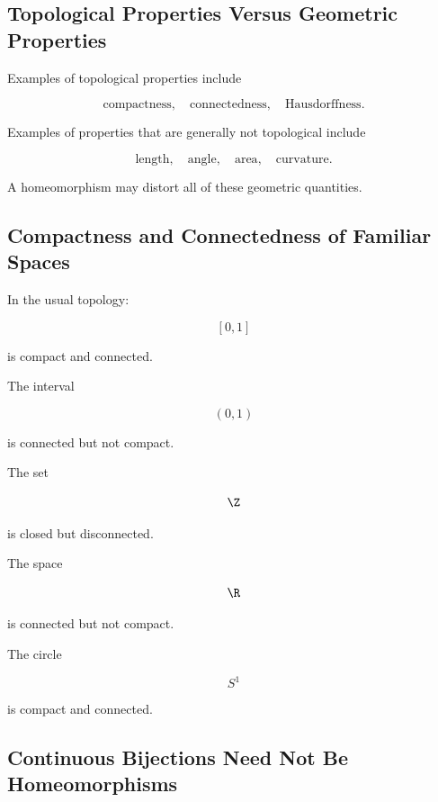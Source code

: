 \subsection{Topological Properties Versus Geometric Properties}
\label{subsec:topological-vs-geometric-properties}

Examples of topological properties include

\[
\boxed{
\text{compactness},
\quad
\text{connectedness},
\quad
\text{Hausdorffness}.
}
\]

Examples of properties that are generally not topological include

\[
\boxed{
\text{length},
\quad
\text{angle},
\quad
\text{area},
\quad
\text{curvature}.
}
\]

A homeomorphism may distort all of these geometric quantities.

\subsection{Compactness and Connectedness of Familiar Spaces}
\label{subsec:familiar-space-properties}

In the usual topology:

\[
[0,1]
\]

is compact and connected.

The interval

\[
(0,1)
\]

is connected but not compact.

The set

\[
\Z
\]

is closed but disconnected.

The space

\[
\R
\]

is connected but not compact.

The circle

\[
S^1
\]

is compact and connected.

\subsection{Continuous Bijections Need Not Be Homeomorphisms}
\label{subsec:continuous-bijection-not-homeomorphism}

